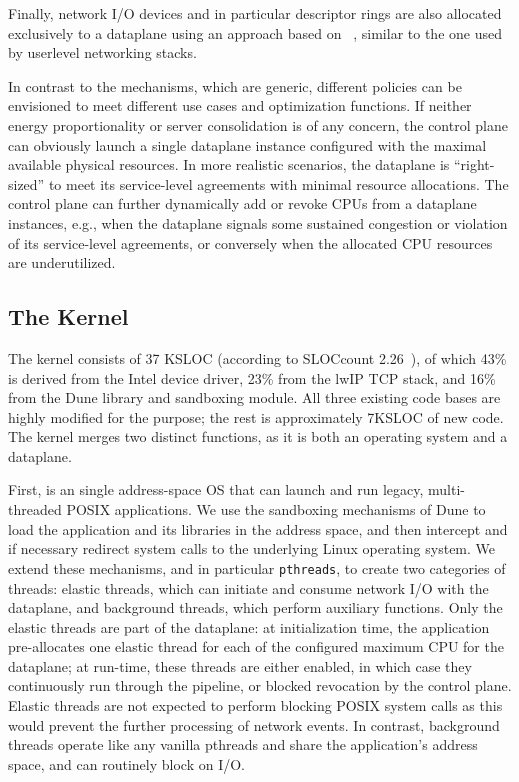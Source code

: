 Finally, network I/O devices and in particular descriptor rings are
also allocated exclusively to a dataplane using an approach based on
~\cite{missing}, similar to the one used by userlevel
networking stacks.

In contrast to the mechanisms, which are generic, different policies
can be envisioned to meet different use cases and optimization
functions.  If neither energy proportionality or server consolidation
is of any concern, the control plane can obviously launch a single
dataplane instance configured with the maximal available physical
resources.  In more realistic scenarios, the dataplane is
``right-sized'' to meet its service-level agreements with minimal
resource allocations.  The control plane can further dynamically add
or revoke CPUs from a dataplane instances, e.g., when the dataplane
signals some sustained congestion or violation of its service-level
agreements, or conversely when the allocated CPU resources are
underutilized.

%

\subsection{The \ix Kernel}
\label{sec:impl:kernel}

The \ix kernel consists of 37 KSLOC (according to SLOCcount
2.26~\cite{url:sloccount}), of which 43\% is derived from the Intel device
driver, 23\% from the lwIP TCP stack, and 16\% from the Dune library
and sandboxing module.  All three existing code bases are highly
modified for the purpose; the rest is approximately 7KSLOC of new
code.  The \ix kernel merges two distinct functions, as it is both an
operating system and a dataplane.



First, \ix is an single address-space OS that can launch and run
legacy, multi-threaded POSIX applications.  We use the sandboxing
mechanisms of Dune to load the application and its libraries in the
address space, and then intercept and if necessary redirect system
calls to the underlying Linux operating system. We extend these
mechanisms, and in particular \texttt{pthreads}, to create two
categories of threads: elastic threads, which can initiate and consume
network I/O with the dataplane, and background threads, which perform
auxiliary functions.  Only the elastic threads are part of the
dataplane: at initialization time, the application pre-allocates one
elastic thread for each of the configured maximum CPU for the
dataplane; at run-time, these threads are either enabled, in which
case they continuously run through the \ix pipeline, or blocked
revocation by the control plane.  Elastic threads are not expected to
perform blocking POSIX system calls as this would prevent the further
processing of network events.  In contrast, background threads operate
like any vanilla pthreads and share the application's address space,
and can routinely block on I/O.

